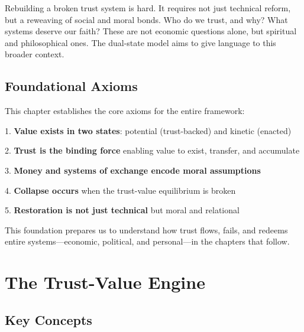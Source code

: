 \documentclass[11pt,oneside]{book}
\begin{document}
Rebuilding a broken trust system is hard. It requires not just technical reform, but a reweaving of social and moral bonds. Who do we trust, and why? What systems deserve our faith? These are not economic questions alone, but spiritual and philosophical ones. The dual-state model aims to give language to this broader context.

\section{Foundational Axioms}

This chapter establishes the core axioms for the entire framework:


1. \textbf{Value exists in two states}: potential (trust-backed) and kinetic (enacted)


2. \textbf{Trust is the binding force} enabling value to exist, transfer, and accumulate


3. \textbf{Money and systems of exchange encode moral assumptions}


4. \textbf{Collapse occurs} when the trust-value equilibrium is broken


5. \textbf{Restoration is not just technical} but moral and relational


This foundation prepares us to understand how trust flows, fails, and redeems entire systems—economic, political, and personal—in the chapters that follow.


\chapter{ The Trust-Value Engine}

\section{Key Concepts}
\end{document}

